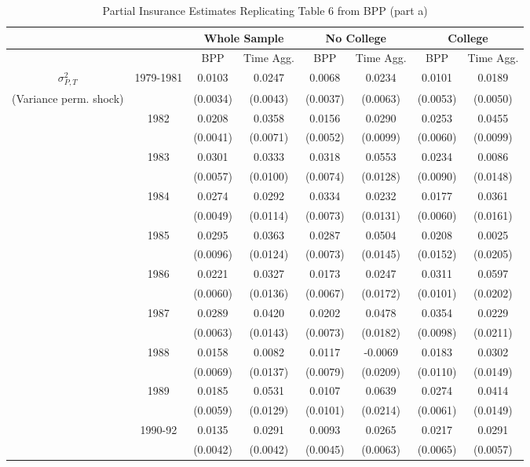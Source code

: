 \begin{table}  
\caption{Partial Insurance Estimates Replicating Table 6 from BPP (part a)}  
\label{table:ReplicationTable6a}  
\begin{center}  
	\tiny
\begin{tabular}{cccc|cc|cc}  
\toprule  
& &  \multicolumn{2}{c}{Whole Sample} &  \multicolumn{2}{c}{No College} &  \multicolumn{2}{c}{College}  
\\ \hline  
& & BPP & Time Agg.  & BPP & Time Agg. & BPP & Time Agg. 
\\ \hline  
 $\sigma^2_{P,T}$ & 1979-1981 & 0.0103 &   0.0247& 0.0068 &   0.0234& 0.0101 &   0.0189 
\\ (Variance perm. shock) &     & (0.0034) & (0.0043) & (0.0037) & (0.0063) & (0.0053) & (0.0050) 
\\  & 1982 & 0.0208 &   0.0358 & 0.0156 &   0.0290 & 0.0253 &   0.0455 
\\  &                    & (0.0041) & (0.0071)  & (0.0052) & (0.0099)  & (0.0060) & (0.0099) 
\\  & 1983 & 0.0301 &   0.0333 & 0.0318 &   0.0553 & 0.0234 &   0.0086 
\\  &                    & (0.0057) & (0.0100)  & (0.0074) & (0.0128)  & (0.0090) & (0.0148) 
\\  & 1984 & 0.0274 &   0.0292 & 0.0334 &   0.0232 & 0.0177 &   0.0361 
\\  &                    & (0.0049) & (0.0114)  & (0.0073) & (0.0131)  & (0.0060) & (0.0161) 
\\  & 1985 & 0.0295 &   0.0363 & 0.0287 &   0.0504 & 0.0208 &   0.0025 
\\  &                    & (0.0096) & (0.0124)  & (0.0073) & (0.0145)  & (0.0152) & (0.0205) 
\\  & 1986 & 0.0221 &   0.0327 & 0.0173 &   0.0247 & 0.0311 &   0.0597 
\\  &                    & (0.0060) & (0.0136)  & (0.0067) & (0.0172)  & (0.0101) & (0.0202) 
\\  & 1987 & 0.0289 &   0.0420 & 0.0202 &   0.0478 & 0.0354 &   0.0229 
\\  &                    & (0.0063) & (0.0143)  & (0.0073) & (0.0182)  & (0.0098) & (0.0211) 
\\  & 1988 & 0.0158 &   0.0082 & 0.0117 &   -0.0069 & 0.0183 &   0.0302 
\\  &                    & (0.0069) & (0.0137)  & (0.0079) & (0.0209)  & (0.0110) & (0.0149) 
\\  & 1989 & 0.0185 &   0.0531 & 0.0107 &   0.0639 & 0.0274 &   0.0414 
\\  &                    & (0.0059) & (0.0129)  & (0.0101) & (0.0214)  & (0.0061) & (0.0149) 
\\  & 1990-92 & 0.0135 &   0.0291 & 0.0093 &   0.0265 & 0.0217 &   0.0291 
\\  &         & (0.0042) & (0.0042) & (0.0045) & (0.0063) & (0.0065) & (0.0057) 
\\ \hline  
 \end{tabular}   
 \end{center}  
\end{table}  
